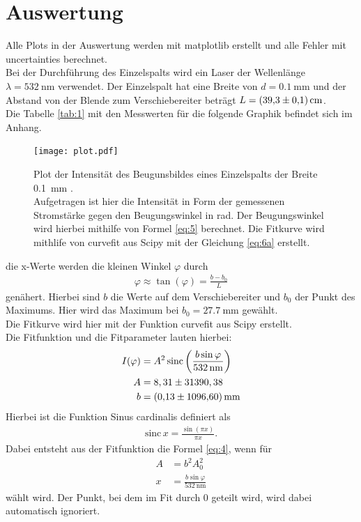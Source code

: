 \section{Auswertung}
Alle Plots in der Auswertung werden mit matplotlib \cite{matplotlib} erstellt und alle
Fehler mit uncertainties \cite{uncertainties} berechnet.\\
Bei der Durchführung des Einzelspalts wird ein Laser der Wellenlänge $\lambda = \SI{532}{\nano\meter} $ verwendet.
Der Einzelspalt hat eine Breite von $d=\SI{0.1}{\milli\meter} $ und der Abstand von 
der Blende zum Verschiebereiter beträgt $L=\SI{39.3+-0.1}{\centi\meter} $.\\
Die Tabelle \ref{tab:1} mit den Messwerten für die folgende Graphik befindet sich im Anhang.
\begin{figure}[H]
    \centering
    \texttt{[image: plot.pdf]}
    \caption{
        Plot der Intensität des Beugunsbildes eines Einzelspalts der Breite \SI{0.1}{\milli\meter} .\cite{matplotlib}\\
        Aufgetragen ist hier die Intensität in Form der gemessenen Stromstärke
        gegen den Beugungswinkel \varphi in rad. Der Beugungswinkel wird hierbei mithilfe von
        Formel \eqref{eq:5} berechnet. Die Fitkurve wird mithlife von curvefit aus Scipy \cite{scipy}
        mit der Gleichung \eqref{eq:6a} erstellt. 
    } 
    \label{fig:4} 
\end{figure}
\justifying die x-Werte werden die kleinen Winkel $\varphi$ durch 
\begin{align}
    \varphi \approx \tan (\varphi) = \frac{b-b_0}{L} \label{eq:5}
\end{align}
genähert. Hierbei sind $b$ die Werte auf dem Verschiebereiter und $b_0$ der Punkt des Maximums.
Hier wird das Maximum bei $b_0= \SI{27.7}{\milli\meter} $ gewählt.\\
Die Fitkurve wird hier mit der Funktion curvefit aus Scipy \cite{scipy} erstellt.\\
Die Fitfunktion und die Fitparameter lauten hierbei:
\begin{subequations}
\begin{align}
    I(\varphi) &= A^2 \,\text{sinc} \left(\frac{b \sin{\varphi}}{\SI{532}{\nano\meter}} \right) \label{eq:6a}\\
    A &= 8,31 \pm 31390,38 \label{eq:6b}\\
    b &= \SI{0.13+-1096.6}{\milli\meter} \label{eq:6c}
\end{align}
\end{subequations}
Hierbei ist die Funktion Sinus cardinalis definiert als
\begin{align}
    \text{sinc}\,x = \frac{\sin (\pi x)}{\pi x} \label{eq:7} .
\end{align}
Dabei entsteht aus der Fitfunktion die Formel \eqref{eq:4}, wenn für
\begin{align}
    A &= b^2 A_0^2 \label{eq:8} \\
    x &= \frac{b \sin{\varphi}}{\SI{532}{\nano\meter}} \label{eq:9}
\end{align}
wählt wird.
Der Punkt, bei dem im Fit durch 0 geteilt wird, wird dabei automatisch ignoriert.



